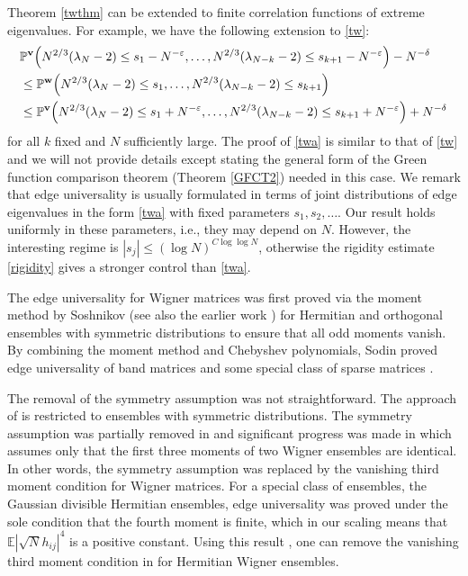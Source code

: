 \documentclass[draft]{article}
\newcommand{\e}{\varepsilon}
\newcommand{\bv}{{\bf{v}}}
\newcommand{\bw}{{\bf{w}}}
\newcommand{\E}{{\mathbb E }}
\renewcommand{\P}{{\mathbb P}}
\numberwithin{equation}{section}
\numberwithin{theorem}{section}
\numberwithin{definition}{section}
\numberwithin{remark}{section}
\begin{document}
Theorem \ref{twthm} can be extended to finite correlation functions of  extreme eigenvalues.
 For example, 
we have the following extension to \eqref{tw}:
 \begin{align}\label{twa}
&  \P^\bv \Big ( N^{2/3}  ( \lambda_N -2) \le s_1- N^{-\e}, \ldots, N^{2/3} ( \lambda_{N-k} -2) 
\le s_{k+1}- N^{-\e} \Big )- N^{-\delta}   \nonumber \\
& 
 \le   \P^\bw \Big ( N^{2/3} (  \lambda_N -2) \le s_1,  \ldots, N^{2/3} ( \lambda_{N-k} -2) 
\le s_{k+1}  \Big )  \\
 &  \le 
 \P^\bv \Big ( N^{2/3} ( \lambda_N -2) \le s_1+ N^{-\e}, \ldots, N^{2/3} ( \lambda_{N-k} -2)
 \le s_{k+1}+ N^{-\e}   \Big )+ N^{-\delta}  \nonumber 
\end{align}  
for all $k$ fixed and $N$ sufficiently  large. The proof of \eqref{twa} is similar to that
 of \eqref{tw} and we will 
not provide details except stating  the general form of the Green function comparison 
theorem (Theorem \ref{GFCT2}) 
needed in this case.  We remark  that edge universality is usually
formulated in terms of joint distributions of edge eigenvalues
in the form \eqref{twa} with fixed parameters $s_1, s_2, \ldots $. Our result 
holds uniformly in these parameters, i.e., 
they may depend on $N$. 
However, the interesting regime is $|s_j|\le (\log N)^{C\log\log N}$, otherwise
the rigidity estimate \eqref{rigidity} gives a stronger control than
\eqref{twa}. 




The edge universality for Wigner matrices was first  proved 
via the moment method by Soshnikov \cite{Sosh} (see also the earlier work \cite{SS})
for Hermitian and orthogonal  ensembles with  symmetric distributions
to ensure that all odd moments vanish.  
By combining the moment 
method and Chebyshev polynomials, Sodin 
proved edge universality of band matrices and some special class
of sparse matrices \cite{So1, So2}. 


The removal of the symmetry assumption was not straightforward. 
The approach of  \cite{So1, So2} is  restricted to ensembles with symmetric distributions. 
The symmetry assumption  was partially removed in 
\cite{P1, P2} and significant progress was made in  \cite{TV2} which assumes only  
that the first three moments of two Wigner ensembles  are identical. In other words, 
the symmetry assumption was replaced 
by the vanishing third moment condition for Wigner matrices.  For a special class of
 ensembles, the Gaussian divisible  Hermitian ensembles, edge universality was proved \cite {J1} 
under the sole condition that the  fourth moment is finite, which
in our scaling means  that $\E |\sqrt{N}h_{ij}|^4$ is a positive constant. 
Using this result \cite{J1}, one can remove the vanishing third moment condition in 
\cite{TV2}  for   Hermitian Wigner ensembles.
\end{document}
